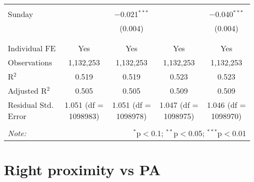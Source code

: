 \documentclass[
]{article}
\begin{document}
\begin{table}[!htbp]
{\begin{tabular}{@{\extracolsep{5pt}}lcccc}
  & & & & \\ 
 Sunday &  & $-$0.021$^{***}$ &  & $-$0.040$^{***}$ \\ 
  &  & (0.004) &  & (0.004) \\ 
  & & & & \\ 
\hline \\[-1.8ex] 
Individual FE & Yes & Yes & Yes & Yes \\ 
Observations & 1,132,253 & 1,132,253 & 1,132,253 & 1,132,253 \\ 
R$^{2}$ & 0.519 & 0.519 & 0.523 & 0.523 \\ 
Adjusted R$^{2}$ & 0.505 & 0.505 & 0.509 & 0.509 \\ 
Residual Std. Error & 1.051 (df = 1098983) & 1.051 (df = 1098978) & 1.047 (df = 1098975) & 1.046 (df = 1098970) \\ 
\hline 
\hline \\[-1.8ex] 
\textit{Note:}  & \multicolumn{4}{r}{$^{*}$p$<$0.1; $^{**}$p$<$0.05; $^{***}$p$<$0.01} \\ 
\end{tabular}
} 
\end{table} 
\newpage
\section{Right proximity vs PA}
\end{document}
